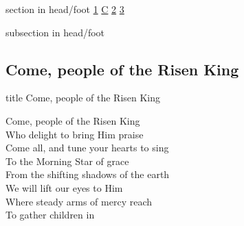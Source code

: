 \documentclass{beamer}
\begin{document}
{
{ 
 {
 \begin{beamercolorbox}[ht=4.5ex,dp=1.5ex,%
      leftskip=.3cm,rightskip=.3cm plus1fil]{section in head/foot}
 \fontsize{12}{25}\selectfont 
\hyperlink{Come, people of the Risen King[]1}{1}
\hyperlink{Come, people of the Risen King[]C}{C}
\hyperlink{Come, people of the Risen King[]2}{2}
\hyperlink{Come, people of the Risen King[]3}{3}
 
 \end{beamercolorbox}%
  \begin{beamercolorbox}[ht=2.5ex,dp=1.125ex,%
   leftskip=.3cm,rightskip=.3cm plus1fil]{subsection in head/foot}
   \insertauthor
 \end{beamercolorbox}%
 }
}
\subsection{ Come, people of the Risen King }

\hypertarget{Come, people of the Risen King[]}{}
\begin{frame}{}
 \vfill
  \centering
  \begin{beamercolorbox}[sep=8pt,center,shadow=true,rounded=true]{title}
    Come, people of the Risen King    
  \end{beamercolorbox}
  \vfill
\end{frame}

\hypertarget{Come, people of the Risen King[]1}{}
\begin{frame}{}
\fontsize{ 18 }{ 23 }\selectfont

Come, people of the Risen King\\ 
Who delight to bring Him praise\\ 
Come all, and tune your hearts to sing\\ 
To the Morning Star of grace\\ 
From the shifting shadows of the earth\\ 
We will lift our eyes to Him\\ 
Where steady arms of mercy reach\\ 
To gather children in 

\end{frame}

\hypertarget{Come, people of the Risen King[]C}{}
\begin{frame}{}
\fontsize{ 18 }{ 23 }\selectfont


\end{frame}}
\end{document}
